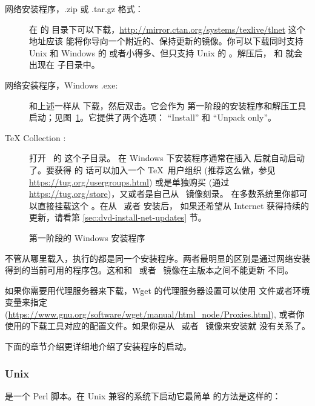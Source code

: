 \documentclass{article}
\begin{document}
\begin{description}
\item [网络安装程序，.zip 或 .tar.gz 格式：] 在 \CTAN 的 
目录下可以下载，\url{http://mirror.ctan.org/systems/texlive/tlnet} 这个地址应该
能将你导向一个附近的、保持更新的镜像。你可以下载同时支持 Unix 和
Windows 的  或者小得多、但只支持 Unix 的
。解压后， 和
 就会出现在  子目录中。

\item[网络安装程序，Windows .exe:] 和上述一样从 \CTAN{} 下载，然后双击。它会作为
第一阶段的安装程序和解压工具启动；见图~\ref{fig:nsis}。它提供了两个选项：
``Install'' 和 ``Unpack only''。

\item [\TeX{} Collection \DVD:] 打开 \DVD\ 的  这个子目录。
在 Windows 下安装程序通常在插入 \DVD 后就自动启动了。要获得 \DVD 的
话可以加入一个 \TeX\ 用户组织 (推荐这么做，参见
\url{https://tug.org/usergroups.html}) 或是单独购买 (通过
\url{https://tug.org/store})，又或者是自己从 \ISO\ 镜像刻录。
在多数系统里你都可以直接挂载这个 \ISO{}。在从 \DVD\ 或者 \ISO{} 安装后，
如果还希望从 Internet 获得持续的更新，请看第 \ref{sec:dvd-install-net-updates}
节。

\end{description}

\begin{figure}[tb]
\caption{第一阶段的 Windows  安装程序}\label{fig:nsis}
\end{figure}

不管从哪里载入，执行的都是同一个安装程序。两者最明显的区别是通过网络安装
得到的当前可用的程序包。这和和 \DVD\ 或者 \ISO\ 镜像在主版本之间不能更新
不同。

如果你需要用代理服务器来下载，Wget 的代理服务器设置可以使用 
文件或者环境变量来指定
(\url{https://www.gnu.org/software/wget/manual/html_node/Proxies.html}),
或者你使用的下载工具对应的配置文件。如果你是从 \DVD\ 或者 \ISO\ 镜像来安装就
没有关系了。

下面的章节介绍更详细地介绍了安装程序的启动。

\subsubsection{Unix}

 是一个 Perl 脚本。在 Unix 兼容的系统下启动它最简单
的方法是这样的：
\end{document}
